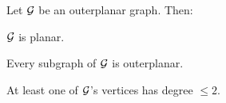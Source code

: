 \begin{prop}
\label{thm:basic-outerplanar-stuff}
Let $\mbox{$\cal G$}$ be an outerplanar graph.  Then:

\smallskip

$\mbox{$\cal G$}$ is planar.


\smallskip

Every subgraph of $\mbox{$\cal G$}$ is outerplanar.

\smallskip

At least one of $\mbox{$\cal G$}$'s vertices has degree $\leq 2$.
\end{prop}

